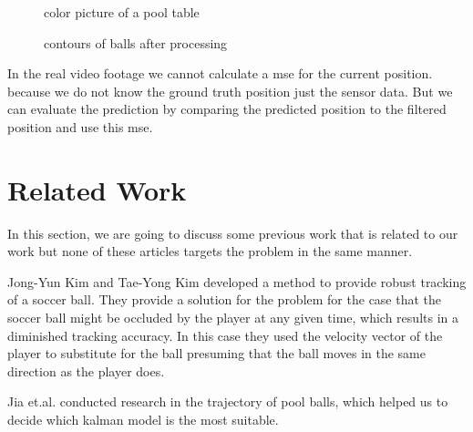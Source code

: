 \documentclass[notitlepage, a4paper, 11pt]{scrartcl}
\begin{document}
\begin{multicols}{2}
\begin{figure}[H]
    \centering
    \caption{color picture of a pool table}
    \label{pic:pool-color}
\end{figure}

\begin{figure}[H]
    \centering
    \caption{contours of balls after processing}
    \label{pic:pool-bw}
\end{figure}

In the real video footage we cannot calculate a mse for the current position. because we do not know the ground truth position just the sensor data.
But we can evaluate the prediction by comparing the predicted position to the filtered position and use this mse.

\section{Related Work}

In this section, we are going to discuss some previous work that is related to our work but none of these articles targets the problem in the same manner.

Jong-Yun Kim and Tae-Yong Kim \cite{kim} developed a method to provide robust tracking of a soccer ball. 
They provide a solution for the problem for the case that the soccer ball might be occluded by the player at any given time,
which results in a diminished tracking accuracy. 
In this case they used the velocity vector of the player to substitute for the ball presuming that the ball moves in the same direction as the player does.

Jia et.al. \cite{jia} conducted research in the trajectory of pool balls, which helped us to decide which kalman model is the most suitable.


\end{multicols}
\end{document}
